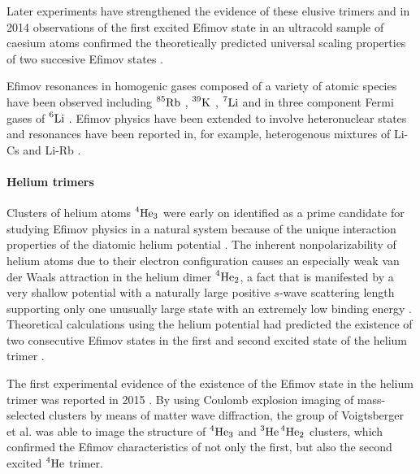 Later experiments have strengthened the evidence of these elusive trimers and in 2014 observations of the first excited Efimov state in an ultracold sample of caesium atoms confirmed the theoretically predicted universal scaling properties of two succesive Efimov states \cite{Huang2014}.

Efimov resonances in homogenic gases composed of a variety of atomic species have been observed including $\prescript{85}{}{\mathrm{Rb}}$ \cite{Klauss2017}, $\prescript{39}{}{\mathrm{K}}$ \cite{Potassium}, $\prescript{7}{}{\mathrm{Li}}$ \cite{Lithium7} and in three component Fermi gases of $\prescript{6}{}{\mathrm{Li}}$ \cite{Williams2009}. Efimov physics have been extended to involve heteronuclear states and resonances have been reported in, for example, heterogenous mixtures of Li-Cs and Li-Rb \cite{LithiumRubidium,LithiumCeasium}.

\paragraph{Helium trimers}
Clusters of helium atoms $\prescript{4}{}{\mathrm{He}}_3$ were early on identified as a prime candidate for studying Efimov physics in a natural system because of the unique interaction properties of the diatomic helium potential \cite{Lim1977}. The inherent nonpolarizability of helium atoms due to their electron configuration causes an especially weak van der Waals attraction in the helium dimer $\prescript{4}{}{\mathrm{He}}_2$, a fact that is manifested by a very shallow potential with a naturally large positive $s$-wave scattering length supporting only one unusually large state with an extremely low binding energy \cite{Blume2019}. Theoretical calculations using the helium potential had predicted the existence of two consecutive Efimov states in the first and second excited state of the helium trimer \cite{Kamimura2012}.

The first experimental evidence of the existence of the Efimov state in the helium trimer was reported in 2015 \cite{Blume2015}. By using Coulomb explosion imaging of mass-selected clusters by means of matter wave diffraction, the group of Voigtsberger et al. was able to image the structure of $\prescript{4}{}{\mathrm{He}}_3$ and $\prescript{3}{}{\mathrm{He}}\prescript{4}{}{\mathrm{He}}_2$ clusters, which confirmed the Efimov characteristics of not only the first, but also the second excited $\prescript{4}{}{\mathrm{He}}$ trimer. 

